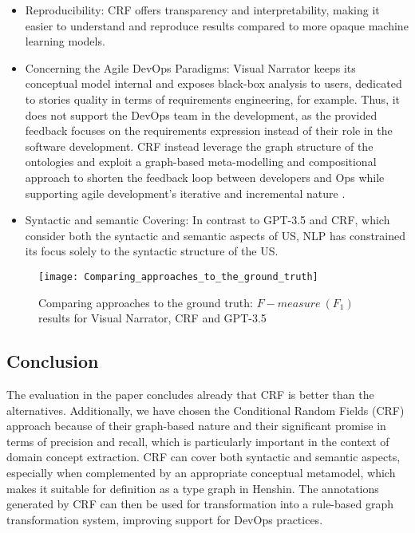 \begin{itemize}
\item Reproducibility: CRF offers transparency and interpretability, making it easier to understand and reproduce results compared to more opaque machine learning models.
\item Concerning the Agile DevOps Paradigms: Visual Narrator keeps its conceptual model internal and exposes black-box analysis to users, dedicated to stories quality in terms of requirements engineering, for example. Thus, it does not support the DevOps team in the development, as the provided feedback focuses on the requirements expression instead of their role in the software development. CRF instead leverage the graph structure of the ontologies and exploit a graph-based meta-modelling and compositional approach to shorten the feedback loop between developers and Ops while supporting agile development’s iterative and incremental nature \cite{mosser2022modelling}.
\item Syntactic and semantic Covering: In contrast to GPT-3.5 and CRF, which consider both the syntactic and semantic aspects of US, NLP has constrained its focus solely to the syntactic structure of the US.
\end{itemize}
\begin{figure}
\center
\texttt{[image: Comparing\_approaches\_to\_the\_ground\_truth]}
\caption{Comparing approaches to the ground truth: $F-measure \ (F_1)$ results for Visual Narrator, CRF and GPT-3.5  \cite{arulmohan2023extracting}}\label{fig:coparing_approaches}
\end{figure}
\subsection{Conclusion}\label{crf_conclusion}
The evaluation in the paper \cite{arulmohan2023extracting} concludes already that CRF is better than the alternatives. Additionally, we have chosen the Conditional Random Fields (CRF) approach because of their graph-based nature and their significant promise in terms of precision and recall, which is particularly important in the context of domain concept extraction. CRF can cover both syntactic and semantic aspects, especially when complemented by an appropriate conceptual metamodel, which makes it suitable for definition as a type graph in Henshin. The annotations generated by CRF can then be used for transformation into a rule-based graph transformation system, improving support for DevOps practices.


